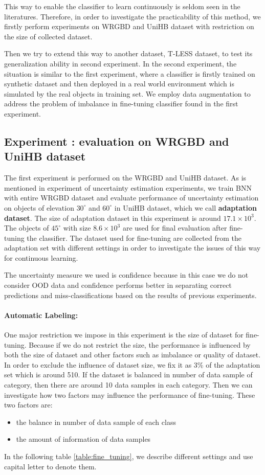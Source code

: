 This way to enable the classifier to learn continuously is seldom seen in the literatures. Therefore, in order to investigate the practicability of this method, we firstly perform experiments on WRGBD and UniHB dataset with restriction on the size of collected dataset. 

Then we try to extend this way to another dataset, T-LESS dataset, to test its generalization ability in second experiment. In the second experiment, the situation is similar to the first experiment, where a classifier is firstly trained on synthetic dataset and then deployed in a real world environment which is simulated by the real objects in training set.  We employ data augmentation to address the problem of imbalance in fine-tuning classifier found in the first experiment.
 
\subsection{Experiment : evaluation on WRGBD and UniHB dataset}
The first experiment is performed on the WRGBD and UniHB dataset. As is mentioned in experiment  of uncertainty estimation experiments, we train BNN with entire WRGBD dataset and evaluate performance of uncertainty estimation on objects of elevation $30^{\circ}$ and $60^{\circ}$ in UniHB dataset, which we call \textbf{adaptation dataset}. The size of adaptation dataset in this experiment is around $17.1\times10^3$. The objects of $45^{\circ}$ with size $8.6\times10^3$ are used for final evaluation after fine-tuning the classifier. The dataset used for fine-tuning are collected from the adaptation set with different settings in order to investigate the issues of this way for continuous learning. 

The uncertainty measure we used is confidence because in this case we do not consider OOD data and confidence performs better in separating correct predictions and miss-classifications based on the results of previous experiments.

\paragraph{Automatic Labeling:}One major restriction we impose in this experiment is the size of dataset for fine-tuning. Because if we do not restrict the size, the performance is influenced by both the size of dataset and other factors such as imbalance or quality of dataset. In order to exclude the influence of dataset size, we fix it as 3\% of the adaptation set which is around 510. If the dataset is balanced in number of data sample of category, then there are around 10 data samples in each category. Then we can investigate how two factors may influence the performance of fine-tuning. 
These two factors are:
\begin{itemize}
	\item the balance in number of data sample of each class 
	\item the amount of information of data samples
\end{itemize}
In the following table \ref{table:fine_tuning}, we describe different settings and use capital letter to denote them.

